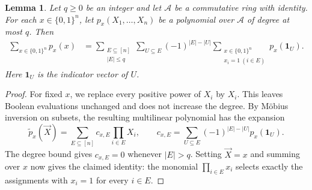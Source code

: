 \documentclass[11pt,reqno]{amsart}
\numberwithin{equation}{section}
\newtheorem{lemma}[theorem]{Lemma}
\theoremstyle{definition}\newtheorem{definition}[theorem]{Definition}
\theoremstyle{remark}\newtheorem{remark}[theorem]{Remark}
\renewcommand{\le}{\leqslant}
\renewcommand{\ge}{\geqslant}
\begin{document}
\begin{lemma}\label{lem:boolean-differences}
Let $q\ge0$ be an integer and let $\mathcal A$ be a commutative
ring with identity. For each $x\in\{0,1\}^n$, let
$p_x(X_1,\ldots,X_n)$ be a polynomial over $\mathcal A$ of degree
at most $q$. Then
\begin{align}
 \sum_{x\in\{0,1\}^n}p_x(x)
 &=\sum_{\substack{E\subseteq[n]\\|E|\le q}}
   \sum_{U\subseteq E}(-1)^{|E|-|U|}
   \sum_{\substack{x\in\{0,1\}^n\\x_i=1\ (i\in E)}}
                  p_x(\mathbf1_U).
 \label{eq:boolean-differences}
\end{align}
Here $\mathbf1_U$ is the indicator vector of $U$.
\end{lemma}
\begin{proof}
For fixed $x$, we replace every positive power of $X_i$ by $X_i$.
This leaves Boolean evaluations unchanged and does not increase
the degree. By M\"obius inversion on subsets, the resulting
multilinear polynomial has the expansion
\[
 \widetilde p_x(\vec{X})=\sum_{E\subseteq[n]}c_{x,E}\prod_{i\in E}X_i,
 \qquad
 c_{x,E}=\sum_{U\subseteq E}(-1)^{|E|-|U|}p_x(\mathbf1_U).
\]
The degree bound gives $c_{x,E}=0$ whenever $|E|>q$.
Setting $\vec{X}=x$ and summing over $x$ now gives the claimed identity:
the monomial $\prod_{i\in E}x_i$
selects exactly the assignments with $x_i=1$ for every $i\in E$.
\end{proof}
\end{document}
